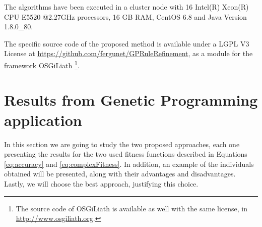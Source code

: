 \documentclass[a4paper,10pt,twocolumn,preprint,3p]{elsarticle}
\begin{document}
The algorithms have been executed in a cluster node with 16 Intel(R) Xeon(R) CPU E5520
@2.27GHz processors, 16 GB RAM, CentOS 6.8 and Java Version 1.8.0\_80.

The specific source code of the proposed method is available under a LGPL V3 License 
at \url{https://github.com/fergunet/GPRuleRefinement}, as a module for 
the framework OSGiLiath \cite{DBLP:journals/soco/Garcia-SanchezGCAG13} 
\footnote{The source code of OSGiLiath is available as well with the same license, in \url{http://www.osgiliath.org}.}.







\section{Results from Genetic Programming application}
\label{sec:gp}


In this section we are going to study the two proposed approaches,
each one presenting the results for the two used fitness functions
described in Equations \ref{eq:accuracy} and \ref{eq:complexFitness}. In addition,
an example of the individuals obtained will be presented, along with
their advantages and disadvantages. Lastly, we will choose the best
approach, justifying this choice. 
\end{document}
